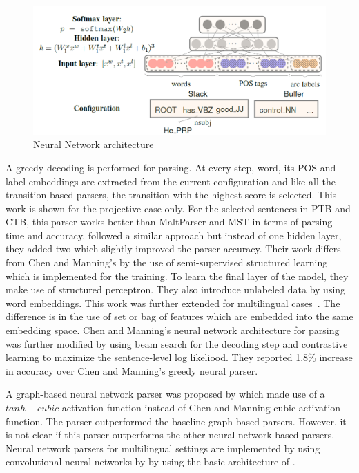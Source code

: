 \begin{figure}[t]
    \centering
    \includegraphics[scale = 0.5]{figures/NNchenmanning.png}
    \centering
    \caption{Neural Network architecture~\citep{chen2014fast}}
    \label{fig:NNchenmanning}
\end{figure}

A greedy decoding is performed for parsing. At every step, word, its POS and label embeddings are extracted from the current configuration and like all the transition based parsers, the transition with the highest score is selected. This work is shown for the projective case only. For the selected sentences in PTB and CTB, this parser works better than MaltParser and MST in terms of parsing time and accuracy. 
\cite{weiss2015structured} followed a similar approach but instead of one hidden layer, they added two which slightly improved the parser accuracy. Their work differs from Chen and Manning's by the use of semi-supervised structured learning which is implemented for the training. To learn the final layer of the model, they make use of structured perceptron. They also introduce unlabeled data by using word embeddings. This work was further extended for multilingual cases~\citep{alberti2015improved}. The difference is in the use of set or bag of features which are embedded into the same embedding space. 
Chen and Manning's neural network architecture for parsing was further modified by 
\cite{zhou2015neural} using beam search for the decoding step and contrastive learning to maximize the sentence-level log likeliood. They reported 1.8\% increase in accuracy over Chen and Manning's greedy neural parser.

A graph-based neural network parser was proposed by \cite{pei2015effective} which made use of a $tanh-cubic$ activation function instead of Chen and Manning cubic activation function. The parser outperformed the baseline graph-based parsers. However, it is not clear if this parser outperforms the other neural network based parsers. Neural network parsers for multilingual settings are implemented by using convolutional neural networks by \cite{zhang2016probabilistic} by using the basic architecture of \cite{pei2015effective}.

